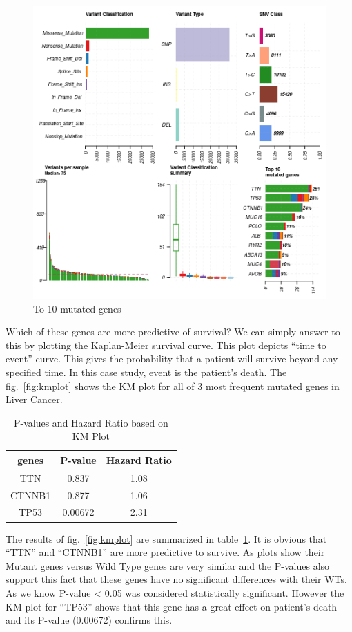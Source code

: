 \documentclass[12pt, ]{article}
\begin{document}
\begin{figure}[!htbp]
\centering
\includegraphics[width=.6\textwidth]{plots/lihc_mutect.png}
\caption{To 10 mutated genes}
\label{fig:mutatedgenes}
\end{figure}


 Which of these genes are more predictive of survival? We can simply answer to this by plotting the Kaplan-Meier survival curve. This plot depicts 
``time to event'' curve. This gives the probability that a patient will survive beyond any specified time. 
In this case study, event is the patient's death. The fig.~\ref{fig:kmplot} shows the KM plot for all of 3 most frequent mutated genes in Liver Cancer. 

\begin{table}[!htbp]
\centering
\begin{tabular}{c|c|c}
    genes  & P-value & Hazard Ratio \\ \midrule
    TTN & 0.837\phantom{00} & 1.08 \\
    CTNNB1 & 0.877\phantom{00} & 1.06 \\
    TP53 & 0.00672 & 2.31 \\
\end{tabular}
\caption{P-values and Hazard Ratio based on KM Plot}
\label{tab:kmplot}
\end{table}

The results of fig.~\ref{fig:kmplot} are summarized in table~\ref{tab:kmplot}. It is obvious that ``TTN'' and ``CTNNB1'' are more predictive to survive. 
As plots show their Mutant genes versus Wild Type genes are very similar and the P-values
also support this fact that these genes have no significant differences with their WTs.
As we know P-value < 0.05 was considered statistically significant.
However the KM plot for ``TP53'' shows that this gene has a great 
effect on patient's death and its P-value (0.00672) confirms this. 
\end{document}
